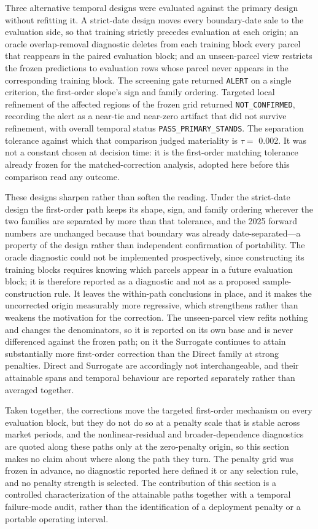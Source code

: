 \documentclass[10pt]{article}
\theoremstyle{definition}
\newcommand{\1}{\mathbf{1}}
\begin{document}
Three alternative temporal designs were evaluated against the primary design without
refitting it. A strict-date design moves every boundary-date sale to the evaluation
side, so that training strictly precedes evaluation at each origin; an oracle
overlap-removal diagnostic deletes from each training block every parcel that reappears
in the paired evaluation block; and an unseen-parcel view restricts the frozen
predictions to evaluation rows whose parcel never appears in the corresponding training
block. The screening gate returned \texttt{ALERT} on a single criterion, the first-order
slope's sign and family ordering. Targeted local refinement of the affected regions of
the frozen grid returned \texttt{NOT\_CONFIRMED}, recording the alert as a near-tie and
near-zero artifact that did not survive refinement, with overall temporal status
\texttt{PASS\_PRIMARY\_STANDS}. The separation tolerance against which that comparison
judged materiality is $\tau=$ 0.002. It was not a constant chosen at decision time: it is
the first-order matching tolerance already frozen for the matched-correction analysis,
adopted here before this comparison read any outcome.

These designs sharpen rather than soften the reading. Under the strict-date design the
first-order path keeps its shape, sign, and family ordering wherever the two families
are separated by more than that tolerance, and the 2025 forward numbers are unchanged
because that boundary was already date-separated---a property of the design rather than
independent confirmation of portability. The oracle diagnostic could not be implemented
prospectively, since constructing its training blocks requires knowing which parcels
appear in a future evaluation block; it is therefore reported as a diagnostic and not as
a proposed sample-construction rule. It leaves the within-path conclusions in place, and
it makes the uncorrected origin measurably more regressive, which strengthens rather
than weakens the motivation for the correction. The unseen-parcel view refits nothing
and changes the denominators, so it is reported on its own base and is never differenced
against the frozen path; on it the Surrogate continues to attain substantially more
first-order correction than the Direct family at strong penalties. Direct and Surrogate
are accordingly not interchangeable, and their attainable spans and temporal behaviour
are reported separately rather than averaged together.

Taken together, the corrections move the targeted first-order mechanism on every
evaluation block, but they do not do so at a penalty scale that is stable across market
periods, and the nonlinear-residual and broader-dependence diagnostics are quoted along these paths only at the zero-penalty origin, so this section makes no claim about where along the path they turn. The penalty grid was frozen
in advance, no diagnostic reported here defined it or any selection rule, and no penalty
strength is selected. The contribution of this section is a controlled characterization
of the attainable paths together with a temporal failure-mode audit, rather than the
identification of a deployment penalty or a portable operating interval.
\end{document}
